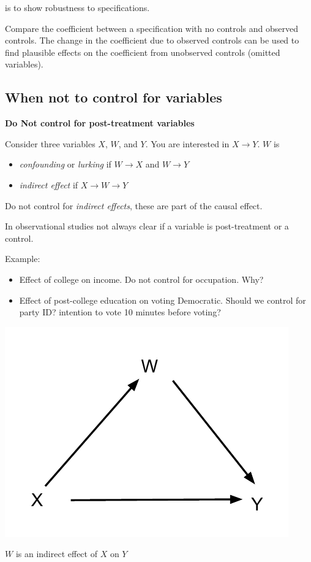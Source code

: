 \documentclass{tufte-handout}
\begin{document}
 is to show robustness to specifications.

Compare the coefficient between a specification with no controls and
observed controls. The change in the coefficient due to observed
controls can be used to find plausible effects on the coefficient from
unobserved controls (omitted variables).

\subsection{When not to control for
variables}\label{when-not-to-control-for-variables}

\textbf{Do Not control for post-treatment variables}

Consider three variables \(X\), \(W\), and \(Y\). You are interested in
\(X \to Y\). \(W\) is

\begin{itemize}
\itemsep1pt\parskip0pt
\item
  \emph{confounding} or \emph{lurking} if \(W \to X\) and \(W \to Y\)
\item
  \emph{indirect effect} if \(X \to W \to Y\)
\end{itemize}

Do not control for \emph{indirect effects}, these are part of the causal
effect.

In observational studies not always clear if a variable is
post-treatment or a control.

Example:

\begin{itemize}
\itemsep1pt\parskip0pt
\item
  Effect of college on income. Do not control for occupation. Why?
\item
  Effect of post-college education on voting Democratic. Should we
  control for party ID? intention to vote 10 minutes before voting?
\end{itemize}

\begin{marginfigure}
\includegraphics{../lectures/images/Mediating_Variable_Diagram.pdf}
\caption{$W$ is an indirect effect of $X$ on $Y$}
\end{marginfigure}
\end{document}
